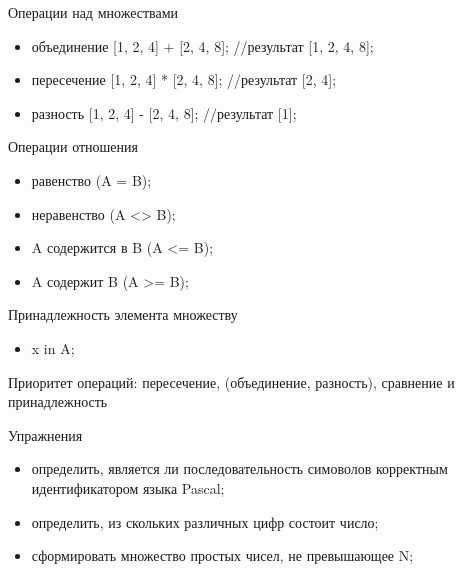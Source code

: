 \documentclass{beamer}
\begin{document}
\begin{frame}
\begin{block}{Операции над множествами}
\begin{itemize}
\item объединение [1, 2, 4] + [2, 4, 8]; //результат [1, 2, 4, 8];
\item пересечение [1, 2, 4] * [2, 4, 8]; //результат [2, 4];
\item разность [1, 2, 4] - [2, 4, 8]; //результат [1];
\end{itemize}
\end{block}
\begin{block}{Операции отношения}
\begin{itemize}
\item равенство (A = B);
\item неравенство (A <> B);
\item A содержится в B (A <= B);
\item A содержит B (A >= B);
\end{itemize}
\end{block}
\begin{block}{Принадлежность элемента множеству}
\begin{itemize}
\item x in A;
\end{itemize}
\end{block}
Приоритет операций: пересечение, (объединение, разность), сравнение и принадлежность
\end{frame}   

\begin{frame}
\begin{block}{Упражнения}
\begin{itemize}
\item определить, является ли последовательность симоволов корректным идентификатором языка Pascal;
\item определить, из скольких различных цифр состоит число;
\item сформировать множество простых чисел, не превышающее N;
\end{itemize}
\end{block}
\end{frame}    
\end{document}
